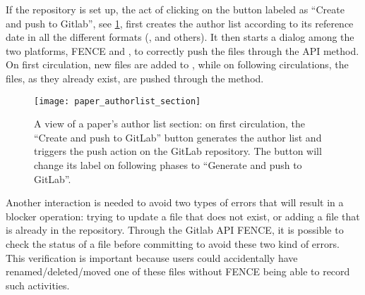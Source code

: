 If the repository is set up, the act of clicking on the button labeled as \enquote{Create and push to Gitlab}, see \cref{fig:paper_authorlist_section},
first creates the author list according to its reference date in all the different formats (,  and others).
It then starts a dialog among the two platforms, FENCE and \gitlab, to correctly push the files through the \gitlab API  method.
On first circulation, new files are added to \gitlab, while on following circulations, the files, as they already exist, are pushed through the  method.

\begin{figure}[htb]
  \centering
  \texttt{[image: paper\_authorlist\_section]}
  \caption{A view of a paper's author list section: on first circulation,
  the \enquote{Create and push to GitLab} button generates the author list and triggers the push action on the GitLab repository.
  The button will change its label on following phases to \enquote{Generate and push to GitLab}.}%
  \label{fig:paper_authorlist_section}
\end{figure}

Another interaction is needed to avoid two types of errors that will result in a blocker operation:
trying to update a file that does not exist, or adding a file that is already in the repository.
Through the Gitlab API FENCE, it is possible to check the status of a file before committing to avoid these two kind of errors.
This verification is important because users could accidentally have renamed/deleted/moved one of these files without FENCE being able to record such activities.